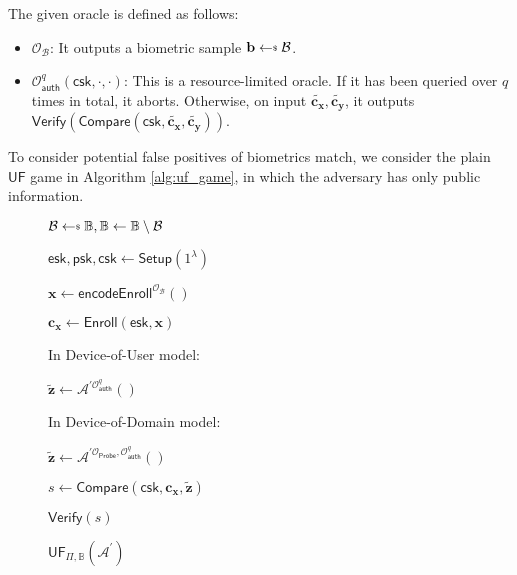 The given oracle is defined as follows:

\begin{itemize}
	\item $\mathcal{O}_{\mathcal{B}}$: It outputs a biometric sample $\mathbf{b} \getsdollar \mathcal{B}$.

	\item $\mathcal{O}_\textsf{auth}^{q}(\textsf{csk}, \cdot, \cdot)$: This is a resource-limited oracle. If it has been queried over $q$ times in total, it aborts. Otherwise, on input $\mathbf{\tilde{c_x}}, \mathbf{\tilde{c_y}}$, it outputs $\textsf{Verify}(\textsf{Compare}(\textsf{csk}, \mathbf{\tilde{c_x}}, \mathbf{\tilde{c_y}} ) )$.
\end{itemize}


To consider potential false positives of biometrics match, we consider the plain $\textsf{UF}$ game in Algorithm \ref{alg:uf_game}, in which the adversary has only public information.

\begin{figure}[H]
\centering
	\begin{minipage}[t]{0.5\linewidth}
	\begin{algorithm}[H]
	\caption{$\textsf{UF}_{\Pi, \mathbb{B}}(\mathcal{A}^\prime)$}
	\label{alg:uf_game}
	\begin{algorithmic}[1]
		\State $\mathcal{B} \getsdollar \mathbb{B}, \mathbb{B} \gets \mathbb{B} \setminus \mathcal{B}$

		\State $\textsf{esk}, \textsf{psk}, \textsf{csk} \gets \textsf{Setup}(1^\lambda)$

		\State $\mathbf{x} \gets \textsf{encodeEnroll}^{\mathcal{O}_{\mathcal{B}}}()$

		\State $\mathbf{c_x} \gets \textsf{Enroll}(\textsf{esk}, \mathbf{x})$

		\State In Device-of-User model:
		
		\State \hspace{\algorithmicindent} ${\mathbf{\tilde{z}}} \gets \mathcal{A}^{\prime \mathcal{O}_\textsf{auth}^q}()$

		\State In Device-of-Domain model:

		\State \hspace{\algorithmicindent} $\mathbf{\tilde{z}} \gets \mathcal{A}^{\prime \mathcal{O}_\textsf{Probe}, \mathcal{O}_\textsf{auth}^q}()$
		
		\State $s \gets \textsf{Compare}( \textsf{csk}, \mathbf{c_x}, \mathbf{\tilde{z}} )$

		\State \Return $\textsf{Verify}(s)$
	\end{algorithmic}
	\end{algorithm}
	\end{minipage}
\label{fig:uf_game}
\end{figure}

